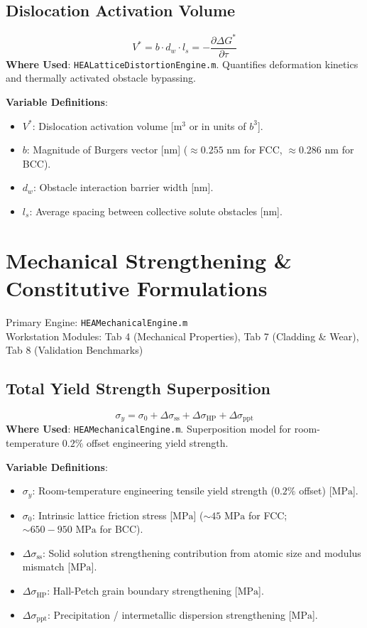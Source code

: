 \documentclass[11pt,a4paper]{article}
\begin{document}
\subsection{Dislocation Activation Volume}
\begin{equation}
V^* = b \cdot d_w \cdot l_s = -\frac{\partial \Delta G^*}{\partial \tau}
\end{equation}
\textbf{Where Used}: \texttt{HEALatticeDistortionEngine.m}. Quantifies deformation kinetics and thermally activated obstacle bypassing.

\noindent\textbf{Variable Definitions}:
\begin{itemize}
  \item $V^*$: Dislocation activation volume [$\text{m}^3$ or in units of $b^3$].
  \item $b$: Magnitude of Burgers vector [$\text{nm}$] ($\approx 0.255\text{ nm}$ for FCC, $\approx 0.286\text{ nm}$ for BCC).
  \item $d_w$: Obstacle interaction barrier width [$\text{nm}$].
  \item $l_s$: Average spacing between collective solute obstacles [$\text{nm}$].
\end{itemize}

\section{Mechanical Strengthening \& Constitutive Formulations}
Primary Engine: \texttt{HEAMechanicalEngine.m} \\
Workstation Modules: Tab 4 (Mechanical Properties), Tab 7 (Cladding & Wear), Tab 8 (Validation Benchmarks)

\subsection{Total Yield Strength Superposition}
\begin{equation}
\sigma_y = \sigma_0 + \Delta\sigma_{\text{ss}} + \Delta\sigma_{\text{HP}} + \Delta\sigma_{\text{ppt}}
\end{equation}
\textbf{Where Used}: \texttt{HEAMechanicalEngine.m}. Superposition model for room-temperature $0.2\%$ offset engineering yield strength.

\noindent\textbf{Variable Definitions}:
\begin{itemize}
  \item $\sigma_y$: Room-temperature engineering tensile yield strength ($0.2\%$ offset) [$\text{MPa}$].
  \item $\sigma_0$: Intrinsic lattice friction stress [$\text{MPa}$] ($\sim 45\text{ MPa}$ for FCC; $\sim 650 - 950\text{ MPa}$ for BCC).
  \item $\Delta\sigma_{\text{ss}}$: Solid solution strengthening contribution from atomic size and modulus mismatch [$\text{MPa}$].
  \item $\Delta\sigma_{\text{HP}}$: Hall-Petch grain boundary strengthening [$\text{MPa}$].
  \item $\Delta\sigma_{\text{ppt}}$: Precipitation / intermetallic dispersion strengthening [$\text{MPa}$].
\end{itemize}
\end{document}
